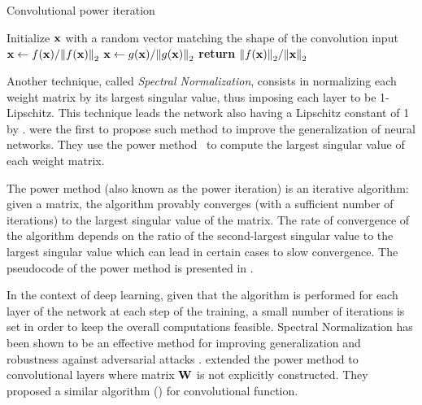 \begin{algorithm}[ht]
  \caption{Convolutional power iteration \cite{farnia2018generalizable}}
  \begin{algorithmic}[1]
    \State Initialize $\mathbf{x}$ with a random vector matching the shape of the convolution input
      \State $\mathbf{x} \gets f(\mathbf{x}) / \norm{f(\mathbf{x})}_2 $
      \State $\mathbf{x} \gets g(\mathbf{x}) / \norm{g(\mathbf{x})}_2$
    \EndFor
    \State \textbf{return} $\norm{f(\mathbf{x})}_2 / \norm{\mathbf{x}}_2$
  \end{algorithmic}
  \label{algorithm:ch3-power_method_generic}
\end{algorithm}


Another technique, called \emph{Spectral Normalization}, consists in normalizing each weight matrix by its largest singular value, thus imposing each layer to be 1-Lipschitz.
This technique leads the network also having a Lipschitz constant of 1 by .
\citet{yoshida2017spectral} were the first to propose such method to improve the generalization of neural networks.
They use the power method~\cite{golub2000eigenvalue} to compute the largest singular value of each weight matrix.

The power method (also known as the power iteration) is an iterative algorithm: given a matrix, the algorithm provably converges (with a sufficient number of iterations) to the largest singular value of the matrix.
The rate of convergence of the algorithm depends on the ratio of the second-largest singular value to the largest singular value which can lead in certain cases to slow convergence.
The pseudocode of the power method is presented in .

In the context of deep learning, given that the algorithm is performed for each layer of the network at each step of the training, a small number of iterations is set in order to keep the overall computations feasible.
Spectral Normalization has been shown to be an effective method for improving generalization and robustness against adversarial attacks \cite{miyato2018spectral,gouk2018regularisation,farnia2018generalizable}.
\citet{farnia2018generalizable,ryu2019plug} extended the power method to convolutional layers where matrix $\mathbf{W}$ is not explicitly constructed.
They proposed a similar algorithm () for convolutional function.



